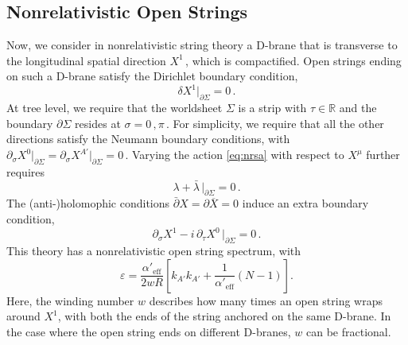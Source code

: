 \documentclass[11pt]{article}
\newcommand{\be}{\begin{equation}}
\newcommand{\ee}{\end{equation}}
\newcommand{\lr}{\left (}
\newcommand{\rr}{\right )}
\newcommand{\ls}{\left [}
\newcommand{\rs}{\right ]}
\newcommand{\p}{\partial}
\begin{document}
\subsection{Nonrelativistic Open Strings} \label{sec:nos}

Now, we consider in nonrelativistic string theory a D-brane that is transverse to the longitudinal spatial direction $X^1$\,, which is compactified. Open strings ending on such a D-brane satisfy the Dirichlet boundary condition,
%
\be
    \delta X^1 \big|_{\p \Sigma} = 0\,.    
\ee
%
At tree level, we require that the worldsheet $\Sigma$ is a strip with $\tau \in \mathbb{R}$ and the boundary $\p\Sigma$ resides at $\sigma = 0\,, \pi$\,. For simplicity, we require that all the other directions satisfy the Neumann boundary conditions, with $\p_\sigma X^0 \big|_{\p\Sigma} = \p_\sigma X^{A'} \big|_{\p\Sigma} = 0$\,. Varying the action \eqref{eq:nrsa} with respect to $X^\mu$ further requires
%
\be
    \lambda + \bar{\lambda} \, \big|_{\p\Sigma} = 0\,.
\ee
%
The (anti-)holomophic conditions $\bar{\p} X = \p \overline{X} = 0$ induce an extra boundary condition,
%
\be
    \p_\sigma X^1 - i \, \p_\tau X^0 \, \big|_{\p\Sigma} = 0\,.
\ee
%
This theory has a nonrelativistic open string spectrum, with
%
\be \label{eq:nrosdr}
    \varepsilon = \frac{\alpha'_\text{eff}}{2 w R} \ls k_{A'} k_{A'} + \frac{1}{\alpha'_\text{eff}} \lr N - 1 \rr \rs.
\ee
%
Here, the winding number $w$ describes how many times an open string wraps around $X^1$, with both the ends of the string anchored on the same D-brane. In the case where the open string ends on different D-branes, $w$ can be fractional.
\end{document}
